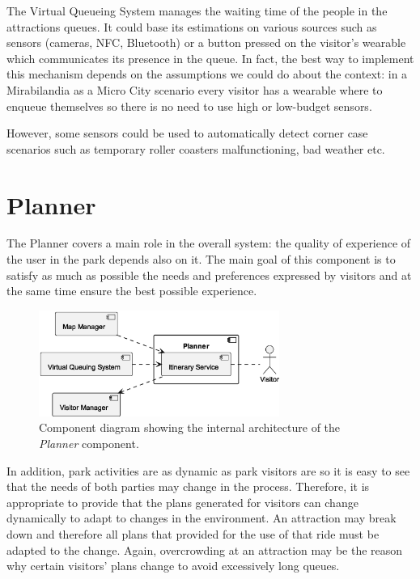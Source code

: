The Virtual Queueing System manages the waiting time of the people in the attractions queues. It could base its estimations on various sources such
as sensors (cameras, NFC, Bluetooth) or a button pressed on the visitor's wearable which communicates its presence in the queue. In fact, the best
way to implement this mechanism depends on the assumptions we could do about the context: in a Mirabilandia as a Micro City scenario every visitor
has a wearable where to enqueue themselves so there is no need to use high or low-budget sensors.

However, some sensors could be used to automatically detect corner case scenarios such as temporary roller coasters malfunctioning, bad weather etc.

\section{Planner}

The Planner covers a main role in the overall system: the quality of experience of the user in the park depends also on it. The main goal of this
component is to satisfy as much as possible the needs and preferences expressed by visitors and at the same time ensure the best possible experience.

\begin{figure}[H]
	\centering
	\includegraphics[width=0.7\textwidth]{img/planner.eps}
	\caption{Component diagram showing the internal architecture of the \textit{Planner} component.}
	\label{fig:planner-arch}
\end{figure}

In addition, park activities are as dynamic as park visitors are so it is easy to see that the needs of both parties may change in the process.
Therefore, it is appropriate to provide that the plans generated for visitors can change dynamically to adapt to changes in the environment. An
attraction may break down and therefore all plans that provided for the use of that ride must be adapted to the change. Again, overcrowding at an
attraction may be the reason why certain visitors' plans change to avoid excessively long queues.

